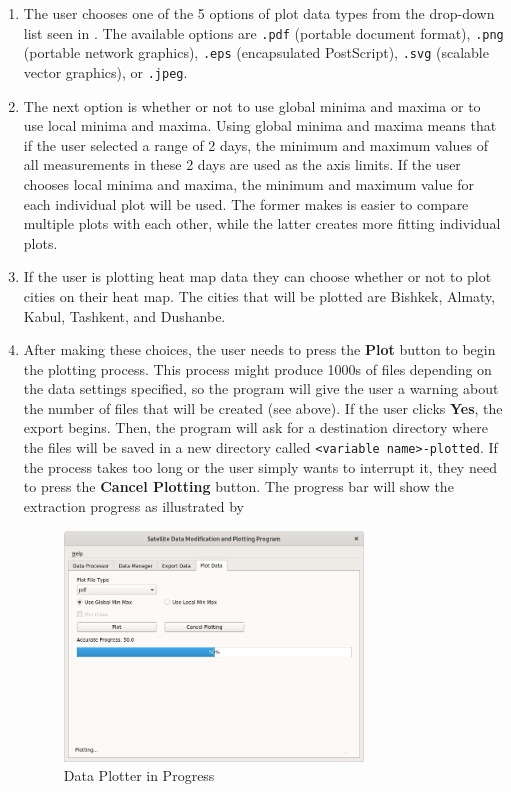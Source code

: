 \documentclass[../00_main.tex]{subfiles}
\begin{document}
\begin{enumerate}
    \item The user chooses one of the 5 options of plot data
        types from the drop-down list seen in . The available
        options are \texttt{.pdf} (portable document format), \texttt{.png}
        (portable network graphics), \texttt{.eps} (encapsulated PostScript), 
        \texttt{.svg} (scalable vector graphics), or \texttt{.jpeg}. 
    \item The next option is whether or not to use global minima and maxima or
        to use local minima and maxima. Using global minima and maxima means
        that if the user selected a range of 2 days, the minimum and maximum 
        values of all measurements in these 2 days are used as the axis limits.
        If the user chooses local minima and maxima, the minimum and maximum
        value for each individual plot will be used. The former makes is easier
        to compare multiple plots with each other, while the latter creates
        more fitting individual plots.
    \item If the user is plotting heat map data they can choose whether or not
        to plot cities on their heat map. The cities that will be plotted are
        Bishkek, Almaty, Kabul, Tashkent, and Dushanbe.
    \item After making these choices, the user needs to press the
        \textbf{Plot} button to begin the plotting process. This
        process might produce 1000s of files depending on the data settings
        specified, so the program will give the user a warning about the number 
        of files that will be created (see  above). 
        If the user clicks \textbf{Yes}, the
        export begins. Then, the program will ask for a destination directory 
        where the files
        will be saved in a new directory called \texttt{<variable
        name>-plotted}. If the process
        takes too long or the user simply wants to interrupt it, they need to
        press the \textbf{Cancel Plotting} button. The progress bar will show the
        extraction progress as illustrated by 
        \begin{figure}[H]
            \center
            \includegraphics[width=0.75\textwidth]{../graphics/dpl03}
            \caption{Data Plotter in Progress}
            \label{dpl03}
        \end{figure}
\end{enumerate}
\end{document}
